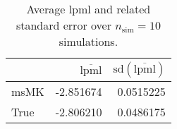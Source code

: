 \begin{table}[H]

\caption{Average lpml and related standard error over $n_{\text{sim}} = 10$ simulations.}
\centering
\begin{tabular}[t]{lrr}
\toprule
  & $\overbar{\text{lpml}}$ & $\text{sd}(\overbar{\text{lpml}})$\\
\midrule
msMK & -2.851674 & 0.0515225\\
True & -2.806210 & 0.0486175\\
\bottomrule
\end{tabular}
\end{table}